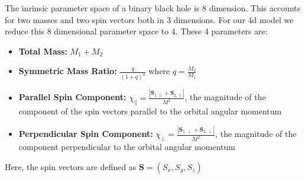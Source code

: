 \documentclass[11pt]{article}
\begin{document}
\noindent
The inrinsic parameter space of a binary black hole is 8 dimension. This accounts for two masses and two spin vectors both in 3 dimensions. 
For our 4d model we reduce this 8 dimensional parameter space to 4. These 4 parameters are:
\begin{itemize}
    \item \textbf{Total Mass:} $M_1 + M_2$
    \item \textbf{Symmetric Mass Ratio:} $\displaystyle \frac{q}{(1+q)^2}$ where $q = \frac{M_2}{M_1}$
    \item \textbf{Parallel Spin Component:} $\displaystyle \chi_{\parallel} = \frac{|\mathbf{S}_{1,\parallel} + \mathbf{S}_{2,\parallel}|}{M^2}$, the magnitude of the component of the spin vectors parallel to the orbital angular momentum
    \item \textbf{Perpendicular Spin Component:} $\displaystyle \chi_{\perp} = \frac{|\mathbf{S}_{1,\perp} + \mathbf{S}_{2,\perp}|}{M^2}$, the magnitude of the component perpendicular to the orbital angular momentum
\end{itemize}
Here, the spin vectors are defined as $\mathbf{S} = (S_x, S_y, S_z)$
\end{document}
